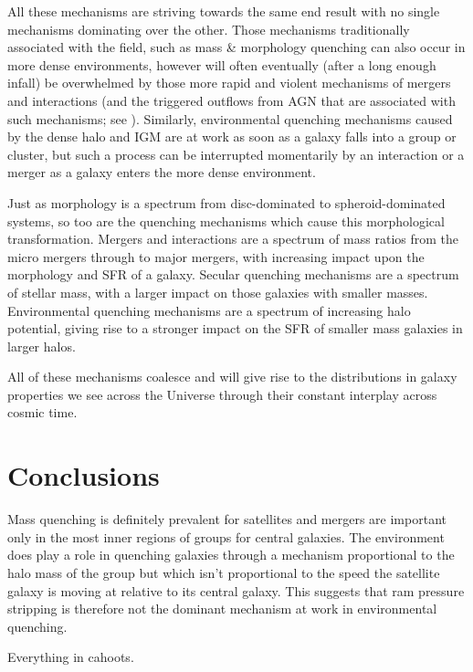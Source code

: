 \documentclass[useAMS,usenatbib]{mn2e}
\begin{document}
All these mechanisms are striving towards the same end result with no single mechanisms dominating over the other. Those mechanisms traditionally associated with the field, such as mass \& morphology quenching can also occur in more dense environments, however will often eventually (after a long enough infall) be overwhelmed by those more rapid and violent mechanisms of mergers and interactions (and the triggered outflows from AGN that are associated with such mechanisms; see \citealt{smethurst16}). Similarly, environmental quenching mechanisms caused by the dense halo and IGM are at work as soon as a galaxy falls into a group or cluster, but such a process can be interrupted momentarily by an interaction or a merger as a galaxy enters the more dense environment.   

Just as morphology is a spectrum from disc-dominated to spheroid-dominated systems, so too are the quenching mechanisms which cause this morphological transformation. Mergers and interactions are a spectrum of mass ratios from the micro mergers \citep{?} through to major mergers, with increasing impact upon the morphology and SFR of a galaxy. Secular quenching mechanisms are a spectrum of stellar mass, with a larger impact on those galaxies with smaller masses. Environmental quenching mechanisms are a spectrum of increasing halo potential, giving rise to a stronger impact on the SFR of smaller mass galaxies in larger halos.  

All of these mechanisms coalesce and will give rise to the distributions in galaxy properties we see across the Universe through their constant interplay across cosmic time. 


\section{Conclusions}\label{sec:conc}

Mass quenching is definitely prevalent for satellites and mergers are important only in the most inner regions of groups for central galaxies. The environment does play a role in quenching galaxies through a mechanism proportional to the halo mass of the group but which isn't proportional to the speed the satellite galaxy is moving at relative to its central galaxy. This suggests that ram pressure stripping is therefore not the dominant mechanism at work in environmental quenching. 

Everything in cahoots. 


  
\end{document}
